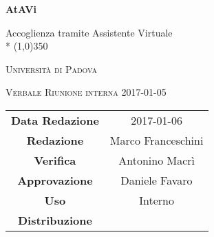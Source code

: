 \documentclass[a4paper,12pt]{article}
\author{Marco Franceschini}
\date{2017-01-05}
\begin{document}
\begin{titlepage}
	\centering
	{\huge\bfseries AtAVi\par}
	Accoglienza tramite Assistente Virtuale \\*
	\line(1,0){350} \\
	{\scshape\LARGE Università di Padova \par}
	\vspace{1cm}
	{\scshape\Large Verbale Riunione interna 2017-01-05\par}
	\vspace{1.5cm}
	\logo
	\vspace{2cm}	
	\vfill \vfill
	\begin{tabular}{c|c}
		{\hfill\textbf{Data Redazione}} 	& 2017-01-06 	\\
		{\hfill\textbf{Redazione}} 			& Marco Franceschini		\\
		{\hfill\textbf{Verifica}} 				& Antonino Macrì \\
		{\hfill\textbf{Approvazione}} 		& Daniele Favaro 	\\
		{\hfill\textbf{Uso}} 						& Interno		\\
		{\hfill\textbf{Distribuzione}} 		& \kpanic\		\\
	\end{tabular}
\end{titlepage}

	
	\newpage
	\pagestyle{myfront}
	\tableofcontents
	
	\label{LastFrontPage}
	\newpage
	\pagestyle{mymain}
		
		
		
		
		
		
		

	
	\label{LastPage}
\end{document}

